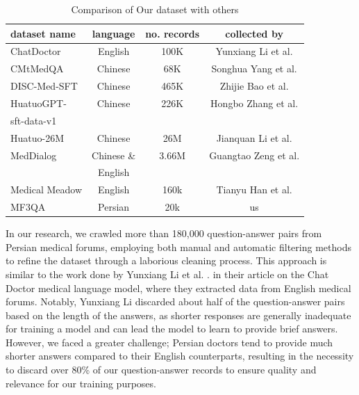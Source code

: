 \documentclass[conference]{IEEEtran}
\begin{document}
	\begin{table}[ht]
		\centering
		\caption{Comparison of Our dataset with others}
		\begin{tabular}{|l|c|c|c|}  %
			\hline
			dataset name            &language & no. records & collected by \\ \hline
			ChatDoctor 	   &English	 & 100K        & Yunxiang Li et al.
			\cite{b6}
			\\ \hline
			CMtMedQA  	   &Chinese	 & 68K        &  Songhua Yang et al.
			\cite{b20}
			\\ \hline
			DISC-Med-SFT	   &Chinese	 & 465K       & Zhijie Bao et al.   
			\cite{b21}
			\\ \hline
			HuatuoGPT-	   &Chinese	 & 226K        & Hongbo Zhang et al.   
			\cite{b22}
			\\ 
			sft-data-v1	   &	     &             & 	\\ \hline
			Huatuo-26M	   &Chinese	 & 26M         & Jianquan Li et al.
			\cite{b23}
			\\ \hline
			MedDialog       &Chinese \&&3.66M       & Guangtao Zeng et al.  \\ 
			&English  &             &  \cite{b23} \\ \hline
			Medical Meadow  &English  & 160k        & Tianyu Han et al. 
			\cite{b25}
			\\ \hline
			MF3QA           &Persian  & 20k            & us \\ \hline
		\end{tabular}
		\label{tab:model_results_on_mcqa}
	\end{table}
	
	
	In our research, we crawled more than 180,000 question-answer pairs from Persian medical forums, employing both manual and automatic filtering methods to refine the dataset through a laborious cleaning process. This approach is similar to the work done by Yunxiang Li et al.
	\cite{b6}.
	in their article on the Chat Doctor medical language model, where they extracted data from English medical forums. Notably, Yunxiang Li discarded about half of the question-answer pairs based on the length of the answers, as shorter responses are generally inadequate for training a model and can lead the model to learn to provide brief answers. However, we faced a greater challenge; Persian doctors tend to provide much shorter answers compared to their English counterparts, resulting in the necessity to discard over 80\% of our question-answer records to ensure quality and relevance for our training purposes.
	
\end{document}

